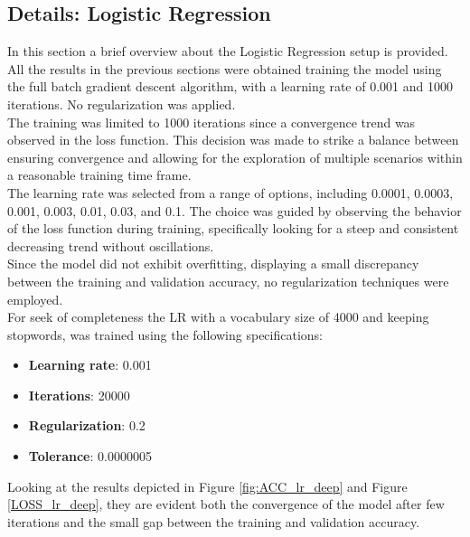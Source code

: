 \documentclass{article}
\begin{document}
\begin{multicols}{2}


\section{Details: Logistic Regression}\label{sec:LR_details}
In this section a brief overview about the Logistic Regression setup is provided.\\
All the results in the previous sections were obtained training the model using the full batch gradient 
descent algorithm, with a learning rate of 0.001 and 1000 iterations. No regularization was applied.\\
The training was limited to 1000 iterations since a convergence trend was observed in the loss function. 
This decision was made to strike a balance between ensuring convergence and allowing for the exploration of multiple 
scenarios within a reasonable training time frame.\\
The learning rate was selected from a range of options, including 0.0001, 0.0003, 0.001, 0.003, 0.01, 0.03, and 0.1. 
The choice was guided by observing the behavior of the loss function during training, specifically looking for a 
steep and consistent decreasing trend without oscillations.\\
Since the model did not exhibit overfitting, displaying a small discrepancy between the training and validation 
accuracy, no regularization techniques were employed.\\

\noindent
For seek of completeness the LR with a vocabulary size of 4000 and keeping stopwords, was trained using the
following specifications:

    \begin{itemize}[leftmargin=9pt]
        \item \textbf{Learning rate}: 0.001
        \item \textbf{Iterations}: 20000 
        \item \textbf{Regularization}: 0.2
        \item \textbf{Tolerance}: 0.0000005
    \end{itemize}

\noindent
Looking at the results depicted in Figure \ref{fig:ACC_lr_deep} and Figure \ref{LOSS_lr_deep}, they are evident both
the convergence of the model after few iterations and the small gap between the training and validation accuracy.


\end{multicols}
\end{document}
